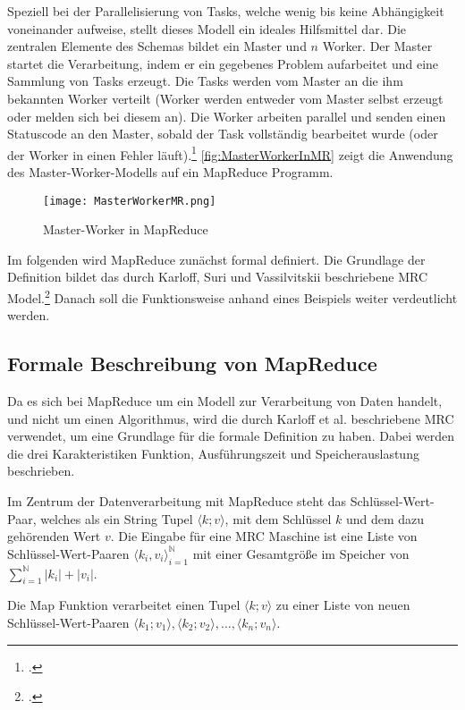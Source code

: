 Speziell bei der Parallelisierung von Tasks, welche wenig bis keine Abhängigkeit voneinander aufweise, stellt dieses Modell ein ideales Hilfsmittel dar. Die zentralen Elemente des Schemas bildet ein Master und $n$ Worker. Der Master startet die Verarbeitung, indem er ein gegebenes Problem aufarbeitet und eine Sammlung von Tasks erzeugt.  Die Tasks werden vom Master an die ihm bekannten Worker verteilt (Worker werden entweder vom Master selbst erzeugt oder melden sich bei diesem an). Die Worker arbeiten parallel und senden einen Statuscode an den Master, sobald der Task vollständig bearbeitet wurde (oder der Worker in einen Fehler läuft).\footcite[Vgl.][S. 80 ff]{Fey.2008} \autoref{fig:MasterWorkerInMR} zeigt die Anwendung des Master-Worker-Modells auf ein MapReduce Programm.

\begin{figure}[h]
	\texttt{[image: MasterWorkerMR.png]}
	\caption{Master-Worker in MapReduce\footnotemark}
	\label{fig:MasterWorkerInMR}
\end{figure}

Im folgenden wird MapReduce zunächst formal definiert. Die Grundlage der Definition bildet das durch Karloff, Suri und Vassilvitskii beschriebene \ac{MRC} Model.\footcite[S. 3 f]{Karloff.2010} Danach soll die Funktionsweise anhand eines Beispiels weiter verdeutlicht werden.

\subsection{Formale Beschreibung von MapReduce}\label{subsec:FormaleBeschreibung}
Da es sich bei MapReduce um ein Modell zur Verarbeitung von Daten handelt, und nicht um einen Algorithmus, wird die durch Karloff et al. beschriebene \ac{MRC} verwendet, um eine Grundlage für die formale Definition zu haben. Dabei werden die drei Karakteristiken Funktion, Ausführungszeit und Speicherauslastung beschrieben.

Im Zentrum der Datenverarbeitung mit MapReduce steht das Schlüssel-Wert-Paar, welches als ein String Tupel $\langle k; v \rangle$, mit dem Schlüssel $k$ und dem dazu gehörenden Wert $v$. Die Eingabe für eine \ac{MRC} Maschine ist eine Liste von Schlüssel-Wert-Paaren $\langle k_i, v_i \rangle_{i=1}^{\mathbb{N}}$ mit einer Gesamtgröße im Speicher von $\sum_{i=1}^{\mathbb{N}}|k_i|+|v_i|$.

Die Map Funktion verarbeitet einen Tupel $\langle k; v \rangle$ zu einer Liste von neuen Schlüssel-Wert-Paaren $\langle k_1; v_1 \rangle, \langle k_2; v_2 \rangle, \dots, \langle k_n; v_n \rangle$.

